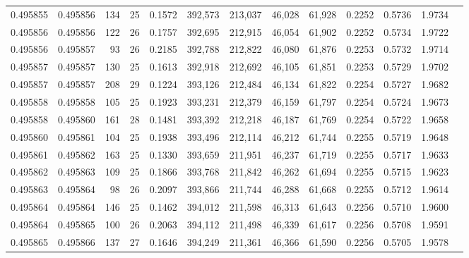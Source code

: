\begin{tabular}{rrrrrrrrrrrrr}
0.495855 & 0.495856 & 134 &  25 &                                     0.1572 & 392,573 & 213,037 &  46,028 &  61,928 & 0.2252 & 0.5736 & 1.9734 \\
0.495856 & 0.495856 & 122 &  26 &                                     0.1757 & 392,695 & 212,915 &  46,054 &  61,902 & 0.2252 & 0.5734 & 1.9722 \\
0.495856 & 0.495857 &  93 &  26 &                                     0.2185 & 392,788 & 212,822 &  46,080 &  61,876 & 0.2253 & 0.5732 & 1.9714 \\
0.495857 & 0.495857 & 130 &  25 &                                     0.1613 & 392,918 & 212,692 &  46,105 &  61,851 & 0.2253 & 0.5729 & 1.9702 \\
0.495857 & 0.495857 & 208 &  29 &                                     0.1224 & 393,126 & 212,484 &  46,134 &  61,822 & 0.2254 & 0.5727 & 1.9682 \\
0.495858 & 0.495858 & 105 &  25 &                                     0.1923 & 393,231 & 212,379 &  46,159 &  61,797 & 0.2254 & 0.5724 & 1.9673 \\
0.495858 & 0.495860 & 161 &  28 &                                     0.1481 & 393,392 & 212,218 &  46,187 &  61,769 & 0.2254 & 0.5722 & 1.9658 \\
0.495860 & 0.495861 & 104 &  25 &                                     0.1938 & 393,496 & 212,114 &  46,212 &  61,744 & 0.2255 & 0.5719 & 1.9648 \\
0.495861 & 0.495862 & 163 &  25 &                                     0.1330 & 393,659 & 211,951 &  46,237 &  61,719 & 0.2255 & 0.5717 & 1.9633 \\
0.495862 & 0.495863 & 109 &  25 &                                     0.1866 & 393,768 & 211,842 &  46,262 &  61,694 & 0.2255 & 0.5715 & 1.9623 \\
0.495863 & 0.495864 &  98 &  26 &                                     0.2097 & 393,866 & 211,744 &  46,288 &  61,668 & 0.2255 & 0.5712 & 1.9614 \\
0.495864 & 0.495864 & 146 &  25 &                                     0.1462 & 394,012 & 211,598 &  46,313 &  61,643 & 0.2256 & 0.5710 & 1.9600 \\
0.495864 & 0.495865 & 100 &  26 &                                     0.2063 & 394,112 & 211,498 &  46,339 &  61,617 & 0.2256 & 0.5708 & 1.9591 \\
0.495865 & 0.495866 & 137 &  27 &                                     0.1646 & 394,249 & 211,361 &  46,366 &  61,590 & 0.2256 & 0.5705 & 1.9578 \\

\end{tabular}
